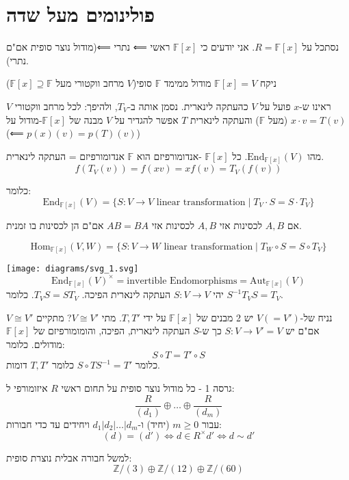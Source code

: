\documentclass{tstextbook}
\begin{document}
\section{פולינומים מעל שדה}

נסתכל על \(R=\mathbb{F}[x]\). אני יודעים כי \(\mathbb{F}[x]\) ראשי ⟸ נתרי ⟸(מודול נוצר סופית אם"ם נתרי).

ניקח \(\mathbb{F}[x]=V\) מודול ממימד \(\mathbb{F}\) סופי(\(V\) מרחב ווקטורי מעל \(\mathbb{F}[x]\supseteq \mathbb{F}\))

ראינו ש-\(x\) פועל על \(V\) כהעתקה לינארית. נסמן אותה ב-\(T_{V}\), ולהיפך:
לכל מרחב ווקטורי \(V\) (מעל \(\mathbb{F}\)) והעתקה לינארית \(T\) אפשר להגדיר על \(V\) מבנה של \(\mathbb{F}[x]\)-מודול על \(x\cdot v=T(v)\)(⟸ \(p(x)(v)=p(T)(v)\))

מהו \(\mathrm{End}_{\mathbb{F}[x]}(V)\). כל \(\mathbb{F}[x]\) -אנדומורפיזם הוא \(\mathbb{F}\) אנדומורפיזם = העתקה לינארית.
$$f(T_{V}(v))=f(xv)=xf(v)=T_{V}(f(v))$$

כלומר:
$$\text{End}_{\mathbb{F} [x]}(V)=\{ S:V\to V \text{ linear transformation} \mid  T_{V}\cdot S = S\cdot T_{V}\}$$

\begin{proposition}
אם \(A,B\) לכסינות אזי \(A,B\) לכסינות אזי \(AB=BA\) אם"ם הן לכסינות בו זמנית.

$$\mathrm{Hom}_{\mathbb{F}[x] }(V,W)=\{ S:V\to W \text{ linear transformation}\mid  T_{W}\circ  S = S\circ  T_{V} \}$$

\texttt{[image: diagrams/svg\_1.svg]}
$$\mathrm{End}_{\mathbb{F} [x]}(V)^{\times}=\text{invertible Endomorphisms} = \mathrm{Aut}_{\mathbb{F} [x]}(V)$$
יהי \(S:V\to V\) העתקה לינארית הפיכה. \(T_{V}S=ST_{V}\).  כלומר \(S^{-1}T_{V}S=T_{V}\).

\end{proposition}
נניח של-\(V(=V')\) יש 2 מבנים של \(\mathbb{F} [x]\) על ידי \(T,T'\). מתי \(V\cong V'\)?
מתקיים \(V\cong V'\) אם"ם יש \(S:V\to V'=V\) כך ש-\(S\) העתקה לינארית, הפיכה, והומומורפיזם של \(\mathbb{F}[x]\) מודולים. כלומר:
$$S\circ  T=T'\circ  S$$
כלומר \(S\circ T S^{-1} = T'\) כלומר \(T,T'\) דומות.

\begin{proposition}
גרסה 1 - כל מודול נוצר סופית על תחום ראשי \(R\) איזומורפי ל:
$$\frac{R}{(d_{1})}\oplus \dots \oplus \frac{R}{(d_{m})}$$
עבור \(m\geq 0\) (יחיד) ו-\(d_{1}|d_{2}|\dots|d_{m}\) ויחידים עד כדי חבורות:
$$(d)=(d')\iff d \in R^{\times}d'\iff d \sim  d'$$

\end{proposition}
למשל חבורה אבלית נוצרת סופית:
$$\mathbb{Z} / (3) \oplus \mathbb{Z} / (12) \oplus \mathbb{Z} / (60)$$
\end{document}
